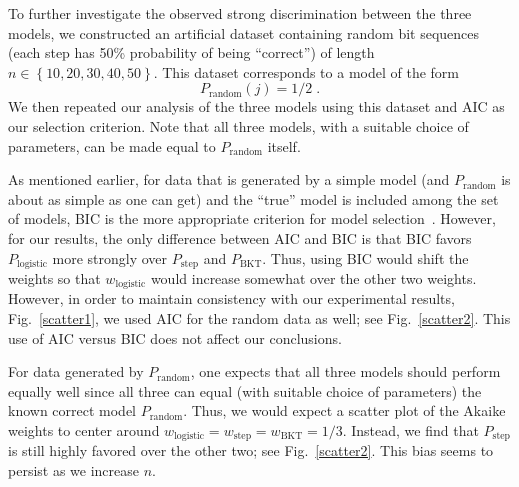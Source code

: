 \documentclass{edm_template}
\begin{document}
To further investigate the observed strong discrimination
between the three models, we constructed an
artificial dataset containing random bit sequences (each
step has 50\% probability of being ``correct'') of length 
$n\in\left\{10,20,30,40,50\right\}$.
This dataset corresponds to a model of the form
%
\begin{equation}
        P_\mathrm{random}(j)=1/2 \; .
\end{equation}
%
We then repeated our analysis of the three models using this dataset
and AIC as our selection criterion.  Note that all three models,
with a suitable choice of parameters, can be made equal to 
$P_\mathrm{random}$ itself.

As mentioned earlier, for data that is generated by a simple 
model (and $P_\mathrm{random}$ is about as
simple as one can get) and the ``true'' model is included among
the set of models, BIC is the more appropriate criterion
for model selection~\cite[Sections~6.3 \& 6.4]{burnham_model_2002}.
However, for our results, the only difference between AIC and BIC 
is that BIC favors $P_\mathrm{logistic}$ more strongly over 
$P_\mathrm{step}$ and $P_\mathrm{BKT}$.  Thus, using BIC would shift 
the weights so that $w_\mathrm{logistic}$ would increase somewhat over 
the other two weights.  However, in order to maintain consistency with
our experimental results, Fig.~\ref{scatter1}, we used AIC for the random data as well;
see Fig.~\ref{scatter2}.  This use of AIC versus BIC does not 
affect our conclusions.

For data generated by $P_\mathrm{random}$,
one expects that all three models should perform equally
well since all three can equal (with suitable choice of parameters)
the known correct model $P_\mathrm{random}$.  Thus, we would expect
a scatter plot of the Akaike weights to center around
$w_\mathrm{logistic}=w_\mathrm{step}=w_\mathrm{BKT}=1/3$.  Instead, we
find that $P_\mathrm{step}$ is still highly favored over the other two; see
Fig.~\ref{scatter2}. This bias seems to persist as we increase $n$.
\end{document}
